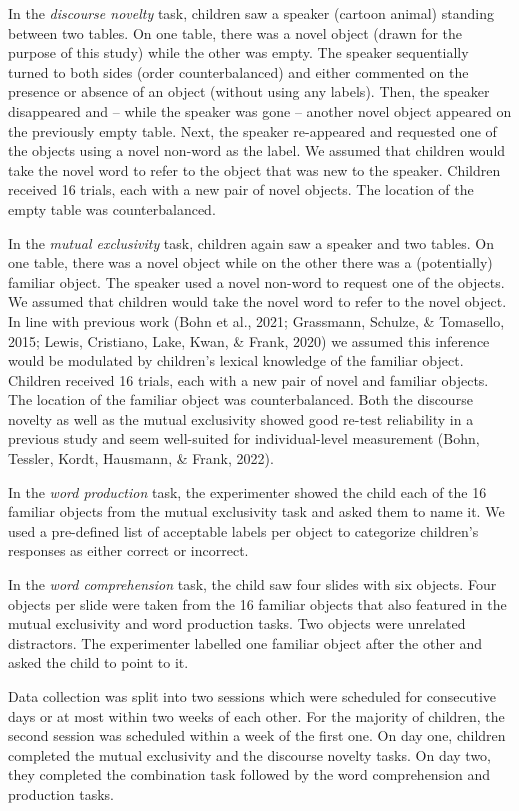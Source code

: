 \documentclass[
  man,floatsintext]{apa6}
\begin{document}
In the \emph{discourse novelty} task, children saw a speaker (cartoon animal) standing between two tables. On one table, there was a novel object (drawn for the purpose of this study) while the other was empty. The speaker sequentially turned to both sides (order counterbalanced) and either commented on the presence or absence of an object (without using any labels). Then, the speaker disappeared and -- while the speaker was gone -- another novel object appeared on the previously empty table. Next, the speaker re-appeared and requested one of the objects using a novel non-word as the label. We assumed that children would take the novel word to refer to the object that was new to the speaker. Children received 16 trials, each with a new pair of novel objects. The location of the empty table was counterbalanced.

In the \emph{mutual exclusivity} task, children again saw a speaker and two tables. On one table, there was a novel object while on the other there was a (potentially) familiar object. The speaker used a novel non-word to request one of the objects. We assumed that children would take the novel word to refer to the novel object. In line with previous work (Bohn et al., 2021; Grassmann, Schulze, \& Tomasello, 2015; Lewis, Cristiano, Lake, Kwan, \& Frank, 2020) we assumed this inference would be modulated by children's lexical knowledge of the familiar object. Children received 16 trials, each with a new pair of novel and familiar objects. The location of the familiar object was counterbalanced. Both the discourse novelty as well as the mutual exclusivity showed good re-test reliability in a previous study and seem well-suited for individual-level measurement (Bohn, Tessler, Kordt, Hausmann, \& Frank, 2022).

In the \emph{word production} task, the experimenter showed the child each of the 16 familiar objects from the mutual exclusivity task and asked them to name it. We used a pre-defined list of acceptable labels per object to categorize children's responses as either correct or incorrect.

In the \emph{word comprehension} task, the child saw four slides with six objects. Four objects per slide were taken from the 16 familiar objects that also featured in the mutual exclusivity and word production tasks. Two objects were unrelated distractors. The experimenter labelled one familiar object after the other and asked the child to point to it.

Data collection was split into two sessions which were scheduled for consecutive days or at most within two weeks of each other. For the majority of children, the second session was scheduled within a week of the first one. On day one, children completed the mutual exclusivity and the discourse novelty tasks. On day two, they completed the combination task followed by the word comprehension and production tasks.
\end{document}
